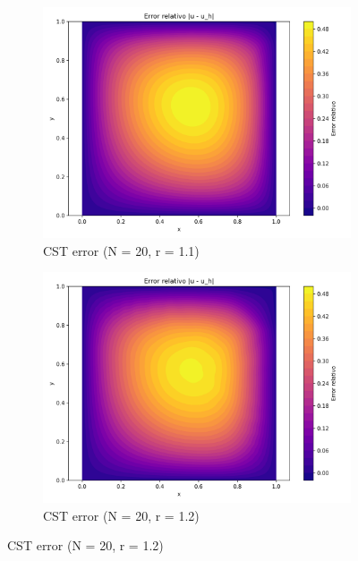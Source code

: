 \documentclass[12pt]{article}
\begin{document}
\begin{figure}[H]
    \centering
    \begin{subfigure}[t]{0.32\textwidth}
        \centering
        \includegraphics[width=\textwidth]{Graficos/21/CST_relative_error_colormap.png}
        \caption{CST error (N = 20, r = 1.1)}
        \label{fig:cst_error_r1.1_n20}
    \end{subfigure}
    \hfill
    \begin{subfigure}[t]{0.32\textwidth}
        \centering
        \includegraphics[width=\textwidth]{Graficos/22/CST_relative_error_colormap.png}
        \caption{CST error (N = 20, r = 1.2)}
        \label{fig:cst_error_r1.2_n20}
    \end{subfigure}

\end{figure}
\end{document}
